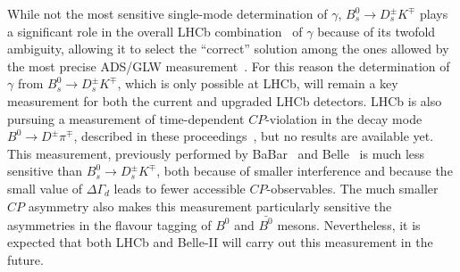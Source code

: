 While not the most sensitive single-mode determination of $\gamma$, $B^0_s \to D^\pm_s K^\mp$ plays a significant
role in the overall LHCb combination~\cite{LHCbGammaCombo} of $\gamma$ because of its twofold ambiguity, allowing it to select the ``correct''
solution among the ones allowed by the most precise ADS/GLW measurement~\cite{ADSGLW}. For this reason the determination
of $\gamma$ from $B^0_s \to D^\pm_s K^\mp$, which is only possible at LHCb, will remain a key measurement for both the current
and upgraded LHCb detectors. LHCb is also pursuing a measurement of time-dependent $CP$-violation in
the decay mode $B^0 \to D^\pm \pi^\mp$, described in these proceedings~\cite{BDPI}, but no results are available yet.
This measurement, previously performed by BaBar~\cite{BaBarBdPi} and Belle~\cite{BelleBdPi}
is much less sensitive than $B^0_s \to D^\pm_s K^\mp$, both because of smaller interference and because
the small value of $\Delta\Gamma_d$ leads to fewer accessible $CP$-observables. The much smaller $CP$ asymmetry
also makes this measurement particularly sensitive the asymmetries in the flavour tagging of $B^0$ and $\bar{B^0}$ mesons.
Nevertheless, it is expected that both LHCb and Belle-II will carry out this measurement in the future.
